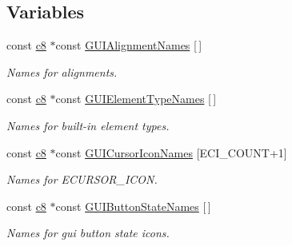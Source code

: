 \subsection*{Variables}
\begin{DoxyCompactItemize}
\item 
\mbox{\label{namespaceirr_1_1gui_af8b834ea286034b188ad08237c302283}} 
const \hyperlink{namespaceirr_a9395eaea339bcb546b319e9c96bf7410}{c8} $\ast$const \hyperlink{namespaceirr_1_1gui_af8b834ea286034b188ad08237c302283}{G\+U\+I\+Alignment\+Names} \mbox{[}$\,$\mbox{]}
\begin{DoxyCompactList}\small\item\em Names for alignments. \end{DoxyCompactList}\item 
\mbox{\label{namespaceirr_1_1gui_ac382ea9ef1647386ea1271387606ff58}} 
const \hyperlink{namespaceirr_a9395eaea339bcb546b319e9c96bf7410}{c8} $\ast$const \hyperlink{namespaceirr_1_1gui_ac382ea9ef1647386ea1271387606ff58}{G\+U\+I\+Element\+Type\+Names} \mbox{[}$\,$\mbox{]}
\begin{DoxyCompactList}\small\item\em Names for built-\/in element types. \end{DoxyCompactList}\item 
\mbox{\label{namespaceirr_1_1gui_a85d1c7fccfb2ca11241e74c332936979}} 
const \hyperlink{namespaceirr_a9395eaea339bcb546b319e9c96bf7410}{c8} $\ast$const \hyperlink{namespaceirr_1_1gui_a85d1c7fccfb2ca11241e74c332936979}{G\+U\+I\+Cursor\+Icon\+Names} \mbox{[}E\+C\+I\+\_\+\+C\+O\+U\+NT+1\mbox{]}
\begin{DoxyCompactList}\small\item\em Names for E\+C\+U\+R\+S\+O\+R\+\_\+\+I\+C\+ON. \end{DoxyCompactList}\item 
\mbox{\label{namespaceirr_1_1gui_a95607be332073192210786fc9e28490c}} 
const \hyperlink{namespaceirr_a9395eaea339bcb546b319e9c96bf7410}{c8} $\ast$const \hyperlink{namespaceirr_1_1gui_a95607be332073192210786fc9e28490c}{G\+U\+I\+Button\+State\+Names} \mbox{[}$\,$\mbox{]}
\begin{DoxyCompactList}\small\item\em Names for gui button state icons. \end{DoxyCompactList}\item 

\end{DoxyCompactItemize}
